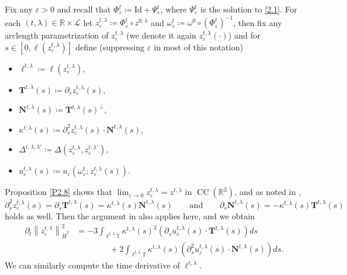 \documentclass[reqno,centertags,12pt]{amsart}
\theoremstyle{definition}
\numberwithin{equation}{section}
\newcommand{\norm}[1]{\left\|#1\right\|}
\newcommand{\bbR}{{\mathbb{R}}}
\newcommand{\bbT}{{\mathbb{T}}}
\newcommand{\eps}{\varepsilon}
\begin{document}
Fix any $\eps>0$ and recall that $\Phi_{\eps}^{t}\coloneqq\mathrm{Id} + \Psi_{\eps}^{t}$,
where $\Psi_{\eps}^{t}$ is the solution to \eqref{2.1}.
For each $(t,\lambda)\in\bbR\times\mathcal{L}$ let $z_{\eps}^{t,\lambda} \coloneqq \Phi_{\eps}^{t}\circ z^{0,\lambda}$
and $\omega_{\eps}^{t}\coloneqq\omega^{0}\circ(\Phi_{\eps}^{t})^{-1}$, then fix any arclength parametrization of $z_{\eps}^{t,\lambda}$ (we denote it again $z_{\eps}^{t,\lambda}(\cdot)$) and for $s\in[0,\ell(z_{\eps}^{t,\lambda})]$ define (suppressing $\eps$ in most of this notation)
\begin{itemize}
    \item $\ell^{t,\lambda}\coloneqq \ell(z_{\eps}^{t,\lambda})$,

    \item $\mathbf{T}^{t,\lambda}(s) \coloneqq \partial_{s}z_{\eps}^{t,\lambda}(s)$,

    \item $\mathbf{N}^{t,\lambda}(s) \coloneqq \mathbf{T}^{t,\lambda}(s)^{\perp}$,

    \item $\kappa^{t,\lambda}(s) \coloneqq
    \partial_{s}^{2}z_{\eps}^{t,\lambda}(s)\cdot \mathbf{N}^{t,\lambda}(s)$,
    
        \item $\Delta^{t,\lambda,\lambda'} \coloneqq
    \Delta(z_{\eps}^{t,\lambda}, z_{\eps}^{t,\lambda'})$,

    \item $u_{\eps}^{t,\lambda}(s) \coloneqq
    u_{\eps}(\omega_{\eps}^{t}; z_{\eps}^{t,\lambda}(s))$.
\end{itemize}
Proposition \ref{P2.8} shows that $\lim_{\eps\to 0} z_\eps^{t,\lambda}= z^{t,\lambda}$ in $\operatorname{CC}(\bbR^{2})$, and
as noted in \cite[Section~4]{JeoZlaTouching}, 
\[
    \partial_{s}^{2}z_{\eps}^{t,\lambda}(s) = \partial_{s}\mathbf{T}^{t,\lambda}(s)
    = \kappa^{t,\lambda}(s)\mathbf{N}^{t,\lambda}(s)
    \qquad\textrm{and}\qquad
    \partial_{s}\mathbf{N}^{t,\lambda}(s) = -\kappa^{t,\lambda}(s)\mathbf{T}^{t,\lambda}(s)
\]
holds as well.
Then the argument in \cite[Lemma~4.1]{JeoZlaTouching} also applies here, and we obtain
\begin{equation}\label{3.2}
    \begin{aligned}
        \partial_{t}\norm{z_{\eps}^{t,\lambda}}_{\dot{H}^{2}}^{2}
        &= -3\int_{\ell^{t,\lambda}\bbT}\kappa^{t,\lambda}(s)^{2}
        \left(\partial_{s}u_{\eps}^{t,\lambda}(s) \cdot \mathbf{T}^{t,\lambda}(s)\right)ds
        \\&\qquad\qquad        
        + 2\int_{\ell^{t,\lambda}\bbT}\kappa^{t,\lambda}(s)
        \left(\partial_{s}^{2}u_{\eps}^{t,\lambda}(s) \cdot \mathbf{N}^{t,\lambda}(s)\right)ds.
    \end{aligned}
\end{equation}
We can similarly compute the time derivative of $\ell^{t,\lambda}$.
\end{document}
